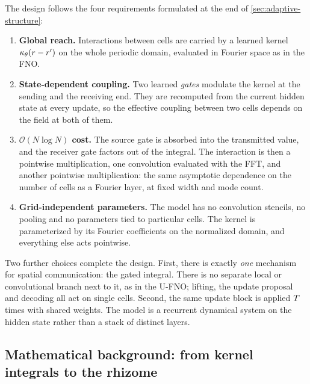 The design follows the four requirements formulated at the end of \cref{sec:adaptive-structure}:
\begin{enumerate}
  \item \textbf{Global reach.} Interactions between cells are carried by a learned kernel $\kappa_\theta(r-r')$ on the whole periodic domain, evaluated in Fourier space as in the FNO.
  \item \textbf{State-dependent coupling.} Two learned \emph{gates} modulate the kernel at the sending and the receiving end. They are recomputed from the current hidden state at every update, so the effective coupling between two cells depends on the field at both of them.
  \item \textbf{$\mathcal{O}(N\log N)$ cost.} The source gate is absorbed into the transmitted value, and the receiver gate factors out of the integral. The interaction is then a pointwise multiplication, one convolution evaluated with the FFT, and another pointwise multiplication: the same asymptotic dependence on the number of cells as a Fourier layer, at fixed width and mode count.
  \item \textbf{Grid-independent parameters.} The model has no convolution stencils, no pooling and no parameters tied to particular cells. The kernel is parameterized by its Fourier coefficients on the normalized domain, and everything else acts pointwise.
\end{enumerate}
Two further choices complete the design. First, there is exactly \emph{one} mechanism for spatial communication: the gated integral. There is no separate local or convolutional branch next to it, as in the U-FNO; lifting, the update proposal and decoding all act on single cells. Second, the same update block is applied $T$ times with shared weights. The model is a recurrent dynamical system on the hidden state rather than a stack of distinct layers.

\subsection{Mathematical background: from kernel integrals to the rhizome}
\label{sec:rhizome-math}

